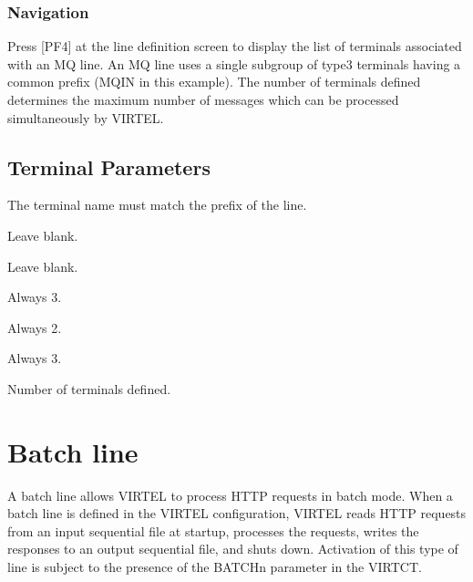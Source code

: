 \documentclass[letterpaper,10pt,english]{sphinxmanual}
\begin{document}
\subsubsection{Navigation}
\label{\detokenize{connectivity_guide:id9}}
\sphinxAtStartPar
Press {[}PF4{]} at the line definition screen to display the list of terminals associated with an MQ line. An MQ line uses a single sub\sphinxhyphen{}group of type\sphinxhyphen{}3 terminals having a common prefix (MQIN in this example). The number of terminals defined determines the maximum number of messages which can be processed simultaneously by VIRTEL.

\sphinxAtStartPar
{}

\ignorespaces 

\subsection{Terminal Parameters}
\label{\detokenize{connectivity_guide:terminal-parameters}}\label{\detokenize{connectivity_guide:index-30}}\begin{description}
\sphinxAtStartPar
The terminal name must match the prefix of the line.

\sphinxAtStartPar
Leave blank.

\sphinxAtStartPar
Leave blank.

\sphinxAtStartPar
Always 3.

\sphinxAtStartPar
Always 2.

\sphinxAtStartPar
Always 3.

\sphinxAtStartPar
Number of terminals defined.

\end{description}

\newpage

\ignorespaces 

\section{Batch line}
\label{\detokenize{connectivity_guide:batch-line}}\label{\detokenize{connectivity_guide:index-31}}
\sphinxAtStartPar
A batch line allows VIRTEL to process HTTP requests in batch mode. When a batch line is defined in the VIRTEL configuration, VIRTEL reads HTTP requests from an input sequential file at startup, processes the requests, writes the responses to an output sequential file, and shuts down. Activation of this type of line is subject to the presence of the BATCHn parameter in the VIRTCT.
\end{document}
